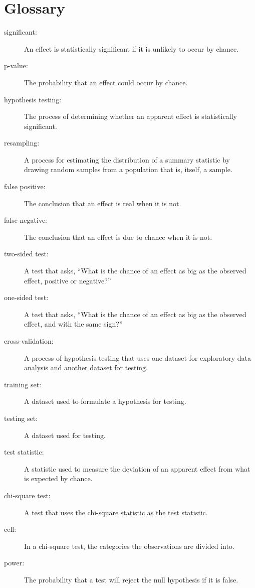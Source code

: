 \documentclass[12pt]{book}
\begin{document}
\section{Glossary}

\begin{description}

\item[significant:] An effect is statistically significant if it is unlikely
to occur by chance.

\item[p-value:] The probability that an effect could occur by chance.

\item[hypothesis testing:] The process of determining whether an apparent
effect is statistically significant.

\item[resampling:] A process for estimating the distribution of a summary
statistic by drawing random samples from a population that is, itself, a
sample.

\item[false positive:] The conclusion that an effect is real when it is not.

\item[false negative:] The conclusion that an effect is due to chance when it
is not.

\item[two-sided test:] A test that asks, ``What is the chance of an effect
as big as the observed effect, positive or negative?''

\item[one-sided test:] A test that asks, ``What is the chance of an effect
as big as the observed effect, and with the same sign?''

\item[cross-validation:] A process of hypothesis testing that uses one
dataset for exploratory data analysis and another dataset for testing.

\item[training set:] A dataset used to formulate a hypothesis for testing.

\item[testing set:] A dataset used for testing.

\item[test statistic:] A statistic used to measure the deviation of an
apparent effect from what is expected by chance.

\item[chi-square test:] A test that uses the chi-square statistic as
the test statistic.

\item[cell:] In a chi-square test, the categories the observations are
divided into.

\item[power:] The probability that a test will reject the null hypothesis
if it is false.

\end{description}
\end{document}
